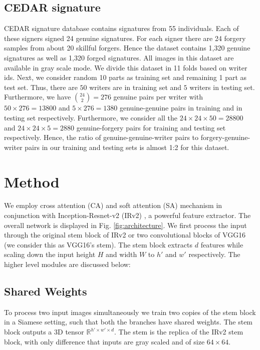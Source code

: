 \documentclass[a4paper,conference]{IEEEtran}
\begin{document}
\subsection{CEDAR signature}
CEDAR signature database \cite{signature_verif_dataset} contains signatures from 55 individuals. Each  of  these  signers  signed  24  genuine  signatures.  For each signer there are 24 forgery samples from about 20 skillful forgers.   Hence the  dataset contains 1,320 genuine signatures as well as 1,320 forged signatures. All images in this dataset are available in gray scale mode.
\newline \indent We divide this dataset in 11 folds based on writer ids. Next, we consider random 10 parts as training set and remaining 1 part as test set. Thus, there are $50$ writers are in training set and $5$ writers in testing set. Furthermore, we have ${24 \choose 2}= 276$ genuine pairs per writer with $50 \times 276 = 13800$ and $5\times276=1380 $ genuine-genuine pairs in training and in testing set respectively. Furthermore, we consider all the $24 \times 24 \times 50 = 28800$ and $24 \times 24 \times 5 = 2880$ genuine-forgery pairs for training and testing set respectively. Hence, the ratio of genuine-genuine-writer pairs to forgery-genuine-writer pairs in our training and testing sets is almost 1:2 for this dataset.

\section{Method}
We employ cross attention (CA) and soft attention (SA) mechanism in conjunction with Inception-Resnet-v2 (IRv2) \cite{szegedy_inception-v4_2017}, a powerful feature extractor. The overall network is displayed in Fig.  \ref{fig:architecture}. We first process the input through the original stem block of IRv2 or two convolutional blocks of VGG16 (we consider this as VGG16's stem). The stem block extracts $d$ features while scaling down the input height $H$ and width $W$ to $h'$ and $w'$ respectively. The higher level modules are discussed below:
\subsection{Shared Weights}
To process two input images simultaneously we train two copies of the stem block in a Siamese setting, such that both the branches have shared weights. The stem block outputs a 3D tensor $\mathbb{R}^{h'\times w'\times d}$. The stem is the replica of the IRv2 stem block, with only difference that inputs are gray scaled and of size $64 \times 64$.
\end{document}
